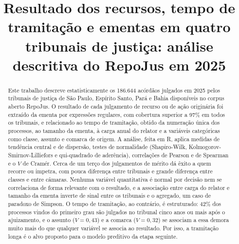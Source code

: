 \documentclass[conference]{IEEEtran}
\begin{document}
\renewcommand{\abstractname}{Resumo}
\renewcommand{\IEEEkeywordsname}{Palavras-chave}

\title{Resultado dos recursos, tempo de tramitação e ementas em quatro tribunais de justiça: análise descritiva do RepoJus em 2025}

\author{
\and
{}
\and
{}
\and
{}
}

\maketitle

\begin{abstract}
Este trabalho descreve estatisticamente os 186.644 acórdãos julgados em 2025
pelos tribunais de justiça de São Paulo, Espírito Santo, Pará e Bahia
disponíveis no corpus aberto RepoJus. O resultado de cada julgamento de recurso
ou de ação originária foi extraído da ementa por expressões regulares, com
cobertura superior a 97\% em todos os tribunais, e relacionado ao tempo de
tramitação, obtido da numeração única dos processos, ao tamanho da ementa, à
carga anual do relator e a variáveis categóricas como classe, assunto e
comarca de origem. A análise, feita em R, aplica medidas de tendência central
e de dispersão, testes de normalidade (Shapiro-Wilk,
Kolmogorov-Smirnov-Lilliefors e qui-quadrado de aderência), correlações de
Pearson e de Spearman e o $V$ de Cramér. Cerca de um terço dos julgamentos de mérito dá êxito a quem recorre ou
impetra, com pouca diferença entre tribunais e grande diferença entre classes
e entre câmaras. Nenhuma variável quantitativa é normal por decisão nem se
correlaciona de forma relevante com o resultado, e a associação entre carga do
relator e tamanho da ementa inverte de sinal entre os tribunais e o agregado,
um caso de paradoxo de Simpson. O tempo de tramitação, ao contrário, é
estruturado: 42\% dos processos vindos do primeiro grau são julgados no
tribunal cinco anos ou mais após o ajuizamento, e o assunto ($V = 0{,}43$) e a
comarca ($V = 0{,}32$) se associam a essa demora muito mais do que qualquer
variável se associa ao resultado. Por isso, a tramitação longa é o alvo
proposto para o modelo preditivo da etapa seguinte.
\end{abstract}
\end{document}
